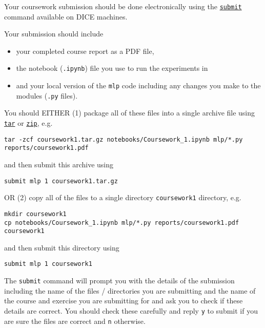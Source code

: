 \documentclass[11pt,]{article}
\begin{document}
Your coursework submission should be done electronically using the
\href{http://computing.help.inf.ed.ac.uk/submit}{\texttt{submit}}
command available on DICE machines.

Your submission should include

\begin{itemize}
\itemsep1pt\parskip0pt
\item
  your completed course report as a PDF file,
\item
  the notebook (\texttt{.ipynb}) file you use to run the experiments in
\item
  and your local version of the \texttt{mlp} code including any changes
  you make to the modules (\texttt{.py} files).
\end{itemize}

You should EITHER (1) package all of these files into a single archive
file using
\href{http://linuxcommand.org/man_pages/tar1.html}{\texttt{tar}} or
\href{http://linuxcommand.org/man_pages/zip1.html}{\texttt{zip}}, e.g.

{\small
\begin{verbatim}
tar -zcf coursework1.tar.gz notebooks/Coursework_1.ipynb mlp/*.py reports/coursework1.pdf
\end{verbatim}
}

and then submit this archive using

\begin{verbatim}
submit mlp 1 coursework1.tar.gz
\end{verbatim}

OR (2) copy all of the files to a single directory \texttt{coursework1}
directory, e.g.

\begin{verbatim}
mkdir coursework1
cp notebooks/Coursework_1.ipynb mlp/*.py reports/coursework1.pdf coursework1
\end{verbatim}

and then submit this directory using

\begin{verbatim}
submit mlp 1 coursework1
\end{verbatim}

The \texttt{submit} command will prompt you with the details of the
submission including the name of the files / directories you are
submitting and the name of the course and exercise you are submitting
for and ask you to check if these details are correct. You should check
these carefully and reply \texttt{y} to submit if you are sure the files
are correct and \texttt{n} otherwise.
\end{document}
